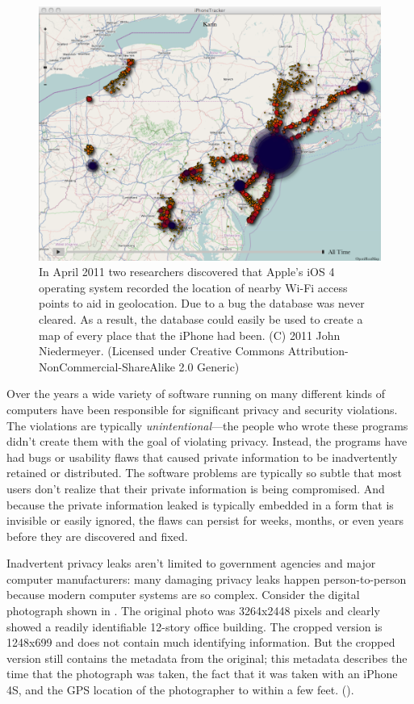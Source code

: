 \begin{figure}
\includegraphics[width=\textwidth]{ch-1/5637893141_ba59f2d989_o.png}
\caption{In April 2011 two researchers discovered that Apple's iOS 4
  operating system recorded the location of nearby Wi-Fi access points
  to aid in geolocation. Due to a bug the database was never
  cleared. As a result, the database could easily be used to create a
  map of every place that the iPhone had been. (C) 2011 John
  Niedermeyer. {\small (Licensed under Creative Commons
  Attribution-NonCommercial-ShareAlike 2.0 Generic)}}\label{heatmap}
\end{figure}

Over the years a wide variety of software running on many different
kinds of computers have been responsible for significant privacy and
security violations. The violations are typically
\emph{unintentional}---the people who wrote these programs didn't
create them with the goal of violating privacy. Instead, the programs
have had bugs or usability flaws that caused private information to be
inadvertently retained or distributed. The software problems are
typically so subtle that most users don't realize that their private
information is being compromised. And because the private information
leaked is typically embedded in a form that is invisible or easily
ignored, the flaws can persist for weeks, months, or even years before
they are discovered and fixed.

Inadvertent privacy leaks aren't limited to government agencies and
major computer manufacturers: many damaging privacy leaks happen
person-to-person because modern computer systems are so
complex. Consider the digital photograph shown in . The
original photo was 3264x2448 pixels and clearly showed a readily
identifiable 12-story office building. The cropped version is 1248x699
and does not contain much identifying information. But the cropped
version still contains the metadata from the original; this metadata
describes the time that the photograph was taken, the fact that it was
taken with an iPhone 4S, and the GPS location of the
photographer to within a few feet. (). 

